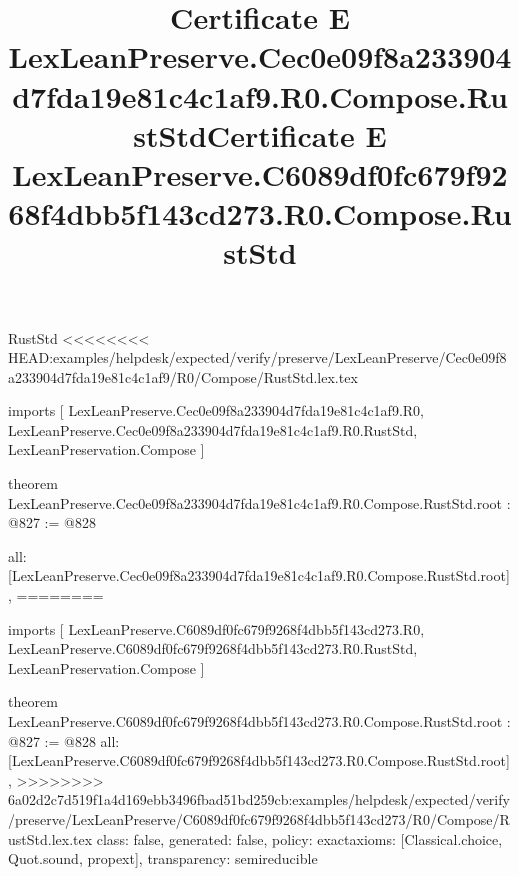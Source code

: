 \begin{lexlean}{RustStd}
<<<<<<<< HEAD:examples/helpdesk/expected/verify/preserve/LexLeanPreserve/Cec0e09f8a233904d7fda19e81c4c1af9/R0/Compose/RustStd.lex.tex
\title{Certificate E LexLeanPreserve.Cec0e09f8a233904d7fda19e81c4c1af9.R0.Compose.RustStd}
\begin{coremodule}
imports [
  LexLeanPreserve.Cec0e09f8a233904d7fda19e81c4c1af9.R0,
  LexLeanPreserve.Cec0e09f8a233904d7fda19e81c4c1af9.R0.RustStd,
  LexLeanPreservation.Compose
]

theorem LexLeanPreserve.Cec0e09f8a233904d7fda19e81c4c1af9.R0.Compose.RustStd.root : @827 := @828 {
  all: [LexLeanPreserve.Cec0e09f8a233904d7fda19e81c4c1af9.R0.Compose.RustStd.root],
========
\title{Certificate E LexLeanPreserve.C6089df0fc679f9268f4dbb5f143cd273.R0.Compose.RustStd}
\begin{coremodule}
imports [
  LexLeanPreserve.C6089df0fc679f9268f4dbb5f143cd273.R0,
  LexLeanPreserve.C6089df0fc679f9268f4dbb5f143cd273.R0.RustStd,
  LexLeanPreservation.Compose
]

theorem LexLeanPreserve.C6089df0fc679f9268f4dbb5f143cd273.R0.Compose.RustStd.root : @827 := @828 {
  all: [LexLeanPreserve.C6089df0fc679f9268f4dbb5f143cd273.R0.Compose.RustStd.root],
>>>>>>>> 6a02d2c7d519f1a4d169ebb3496fbad51bd259cb:examples/helpdesk/expected/verify/preserve/LexLeanPreserve/C6089df0fc679f9268f4dbb5f143cd273/R0/Compose/RustStd.lex.tex
  class: false,
  generated: false,
  policy: exact{axioms: [Classical.choice, Quot.sound, propext]},
  transparency: semireducible
}


\end{coremodule}}
\end{coremodule}
\end{lexlean}
